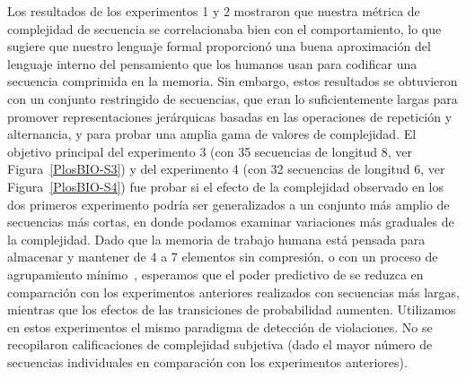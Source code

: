 
Los resultados de los experimentos 1 y 2 mostraron que nuestra métrica de complejidad de secuencia se correlacionaba bien con el comportamiento, lo que sugiere que nuestro lenguaje formal proporcionó una buena aproximación del lenguaje interno del pensamiento que los humanos usan para codificar una secuencia comprimida en la memoria. Sin embargo, estos resultados se obtuvieron con un conjunto restringido de secuencias, que eran lo suficientemente largas para promover representaciones jerárquicas basadas en las operaciones de repetición y alternancia, y para probar una amplia gama de valores de complejidad. El objetivo principal del experimento 3 (con 35 secuencias de longitud 8,  ver Figura~\ref{PlosBIO-S3}) y del experimento 4 (con 32 secuencias de longitud 6, ver Figura~\ref{PlosBIO-S4}) fue probar si el efecto de la complejidad observado en los dos primeros experimento podría ser generalizados a un conjunto más amplio de secuencias más cortas, en donde podamos examinar variaciones más graduales de la complejidad. Dado que la memoria de trabajo humana está pensada para almacenar y mantener de 4 a 7 elementos sin compresión, o con un proceso de agrupamiento mínimo~\cite{f25,f29}, esperamos que el poder predictivo de \grambin se reduzca en comparación con los experimentos anteriores realizados con secuencias más largas, mientras que los efectos de las transiciones de probabilidad aumenten. Utilizamos en estos experimentos el mismo paradigma de detección de violaciones. No se recopilaron calificaciones de complejidad subjetiva (dado el mayor número de secuencias individuales en comparación con los experimentos anteriores).

